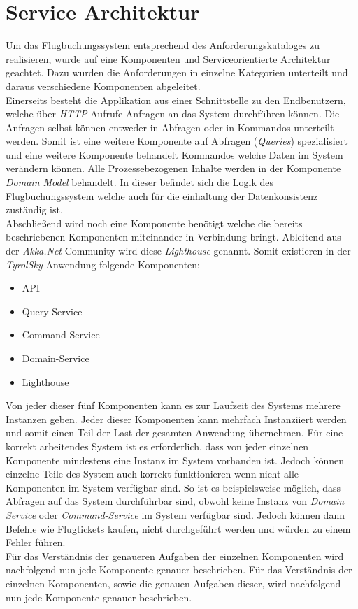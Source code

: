 \section{Service Architektur}
\label{sec:implementation:serviceAndComponentOrientation}
Um das Flugbuchungssystem entsprechend des Anforderungskataloges zu realisieren, wurde auf eine Komponenten und Serviceorientierte Architektur geachtet. Dazu wurden die Anforderungen in einzelne Kategorien unterteilt und daraus verschiedene Komponenten abgeleitet. \\
Einerseits besteht die Applikation aus einer Schnittstelle zu den Endbenutzern, welche über \textit{HTTP} Aufrufe Anfragen an das System durchführen können. Die Anfragen selbst können entweder in Abfragen oder in Kommandos unterteilt werden. Somit ist eine weitere Komponente auf Abfragen (\textit{Queries}) spezialisiert und eine weitere Komponente behandelt Kommandos welche Daten im System verändern können. Alle Prozessebezogenen Inhalte werden in der Komponente \textit{Domain Model} behandelt. In dieser befindet sich die Logik des Flugbuchungssystem welche auch für die einhaltung der Datenkonsistenz zuständig ist. \\
Abschließend wird noch eine Komponente benötigt welche die bereits beschriebenen Komponenten miteinander in Verbindung bringt. Ableitend aus der \textit{Akka.Net} Community wird diese \textit{Lighthouse} genannt. Somit existieren in der \textit{TyrolSky} Anwendung folgende Komponenten:
\begin{itemize}
    \item API
    \item Query-Service
    \item Command-Service
    \item Domain-Service
    \item Lighthouse
\end{itemize}
Von jeder dieser fünf Komponenten kann es zur Laufzeit des Systems mehrere Instanzen  geben. 
Jeder dieser Komponenten kann mehrfach Instanziiert werden und somit einen Teil der Last der gesamten Anwendung übernehmen. Für eine korrekt arbeitendes System ist es erforderlich, dass von jeder einzelnen Komponente mindestens eine Instanz im System vorhanden ist. Jedoch können einzelne Teile des System auch korrekt funktionieren wenn nicht alle Komponenten im System verfügbar sind. So ist es beispielsweise möglich, dass Abfragen auf das System durchführbar sind, obwohl keine Instanz von \textit{Domain Service} oder \textit{Command-Service} im System verfügbar sind. Jedoch können dann Befehle wie Flugtickets kaufen, nicht durchgeführt werden und würden zu einem Fehler führen. \\
Für das Verständnis der genaueren Aufgaben der einzelnen Komponenten wird nachfolgend nun jede Komponente genauer beschrieben.
Für das Verständnis der einzelnen Komponenten, sowie die genauen Aufgaben dieser, wird nachfolgend nun jede Komponente genauer beschrieben.

